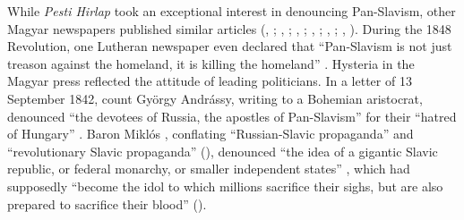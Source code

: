 While \textit{Pesti Hirlap} took an exceptional interest in denouncing Pan-Slavism, other Magyar newspapers published similar articles (, \cite[365--367]{anon__1840-1}; , \cite[405--406]{anon__1840}; , \cite[81--82]{anon_szabolcs_1841}; , \cite[261, 265--266, 271--272]{anon_az_1842}; , \cite[1]{anon_magyarorszag_1842}; , \cite[186]{anon_orosz-es_1842}). During the 1848 Revolution, one Lutheran newspaper even declared that “Pan-Slavism is not just treason against the homeland, it is killing the homeland” \citep[1]{melczer_czafolat_1848}. Hysteria in the Magyar press reflected the attitude of leading politicians. In a letter of 13 September 1842, count György Andrássy, writing to a Bohemian aristocrat, denounced “the devotees of Russia, the apostles of Pan-Slavism” for their “hatred of Hungary” \citep[27]{thun_stellung_1843}. Baron Miklós \citet[166]{wesselenyi_szozat_1843}, conflating “Russian-Slavic propaganda” and “revolutionary Slavic propaganda” (\citeyear[52--53]{wesselenyi_szozat_1843}), denounced “the idea of a gigantic Slavic republic, or federal monarchy, or smaller independent states” \citep[116]{wesselenyi_stimme_1844}, which had supposedly “become the idol to which millions sacrifice their sighs, but are also prepared to sacrifice their blood” (\citeyear[37]{wesselenyi_stimme_1844}).

